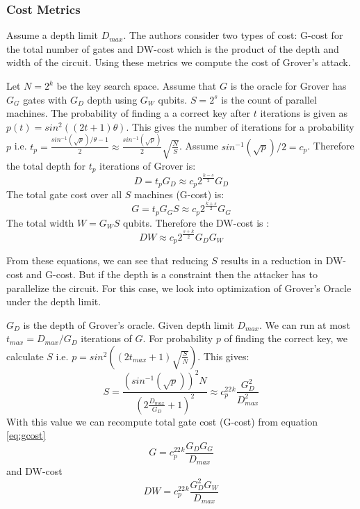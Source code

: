 \documentclass[preprint]{transcrypto}
\begin{document}
\subsubsection{Cost Metrics}
Assume a depth limit $D_{max}$. The authors consider two types of cost: G-cost for the total number of gates and DW-cost which is the product of the depth and width of the circuit. Using these metrics we compute the cost of Grover's attack.

Let $N = 2^k$ be the key search space. Assume that $G$ is the oracle for Grover has $G_G$ gates with $G_D$ depth using $G_W$ qubits. $S = 2^s$ is the count of parallel machines. The probability of finding a a correct key after $t$ iterations is given as $p(t) = sin^2((2t+1)\theta)$. This gives the number of iterations for a probability $p$ i.e. $t_p = \frac{sin^{-1}(\sqrt{p})/\theta - 1}{2} \approx \frac{sin^{-1}(\sqrt{p})}{2}\sqrt{\frac{N}{S}}$. Assume $sin^{-1}(\sqrt{p})/2 = c_p$. Therefore the total depth for $t_p$ iterations of Grover is:
\begin{equation}\label{eq:D}
    D = t_pG_D \approx c_p2^{\frac{k-s}{2}}G_D
\end{equation}
The total gate cost over all $S$ machines (G-cost) is:
\begin{equation}\label{eq:gcost}
    G = t_pG_GS \approx c_p2^{\frac{k+s}{2}}G_G
\end{equation}
The total width $W = G_WS$ qubits. Therefore the DW-cost is :
\begin{equation}\label{eq:DW}
    DW \approx c_p2^{\frac{s+k}{2}}G_DG_W
\end{equation}

From these equations, we can see that reducing $S$ results in a reduction in DW-cost and G-cost. But if the depth is a constraint then the attacker has to parallelize the circuit. For this case, we look into optimization of Grover's Oracle under the depth limit.

$G_D$ is the depth of Grover's oracle. Given depth limit $D_{max}$. We can run at most $t_{max} = D_{max}/G_D$ iterations of $G$. For probability $p$ of finding the correct key, we calculate $S$ i.e. $p = sin^2((2t_{max} + 1)\sqrt{\frac{S}{N}})$. This gives:
\begin{equation}\label{eq:S}
    S = \frac{(sin^{-1}(\sqrt{p}))^2N}{(2\frac{D_{max}}{G_D} + 1)^2} \approx c_p^22^k\frac{G_D^2}{D^2_{max}}
\end{equation}
With this value we can recompute total gate cost (G-cost) from equation \ref{eq:gcost}
\begin{equation}\label{eq:G}
    G = c_p^22^k\frac{G_DG_G}{D_{max}}
\end{equation}
and DW-cost
\begin{equation}\label{eq:DW2}
    DW = c_p^22^k\frac{G_D^2G_W}{D_{max}}
\end{equation}
\end{document}
